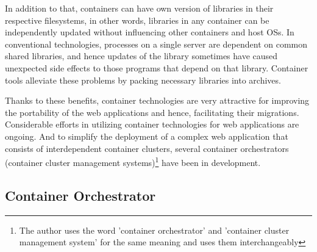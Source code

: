 In addition to that, containers can have own version of libraries in their respective filesystems, in other words, libraries in any container can be independently updated without influencing other containers and host OSs.
In conventional technologies, processes on a single server are dependent on common shared libraries, and hence updates of the library sometimes have caused unexpected side effects to those programs that depend on that library.
Container tools alleviate these problems by packing necessary libraries  into  archives. 

Thanks to these benefits, container technologies are very attractive for improving the portability of the web applications and hence, facilitating their migrations.
Considerable efforts in utilizing container technologies for web applications are ongoing.
And to simplify the deployment of a complex web application that consists of interdependent container clusters, several container orchestrators (container cluster management systems)\footnote{The author uses the word 'container orchestrator' and 'container cluster management system' for the same meaning and uses them interchangeably} have been in development.

\FloatBarrier

\subsection{Container Orchestrator}

